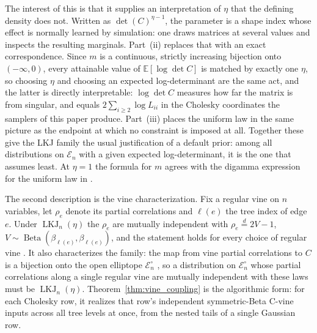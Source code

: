 \documentclass[12pt,english]{article}
\theoremstyle{plain} %
\theoremstyle{definition} %
\theoremstyle{remark} %
\begin{document}
The interest of this is that it supplies an interpretation of $\eta$ that the defining density does not. Written as $\det(C)^{\eta-1}$, the parameter is a shape index whose effect is normally learned by simulation: one draws matrices at several values and inspects the resulting marginals. Part~(ii) replaces that with an exact correspondence. Since $m$ is a continuous, strictly increasing bijection onto $(-\infty,0)$, every attainable value of $\mathbb{E}[\log\det C]$ is matched by exactly one $\eta$, so choosing $\eta$ and choosing an expected log-determinant are the same act, and the latter is directly interpretable: $\log\det C$ measures how far the matrix is from singular, and equals $2\sum_{i\geq2}\log L_{ii}$ in the Cholesky coordinates the samplers of this paper produce. Part~(iii) places the uniform law in the same picture as the endpoint at which no constraint is imposed at all. Together these give the LKJ family the usual justification of a default prior: among all distributions on $\mathcal{E}_n$ with a given expected log-determinant, it is the one that assumes least. At $\eta=1$ the formula for $m$ agrees with the digamma expression for the uniform law in \citet{Hansen:CorrelationMatrix}.

The second description is the vine characterization. Fix a regular vine on $n$ variables, let $\rho_e$ denote its partial correlations and $\ell(e)$ the tree index of edge $e$. Under $\operatorname{LKJ}_n(\eta)$ the $\rho_e$ are mutually independent with $\rho_e\overset{d}{=}2V-1$, $V\sim\operatorname{Beta}(\beta_{\ell(e)},\beta_{\ell(e)})$, and the statement holds for every choice of regular vine \citep[Theorem~1]{LewandowskiKurowickaJoe:2009}. It also characterizes the family: the map from vine partial correlations to $C$ is a bijection onto the open elliptope $\mathcal{E}_n^\circ$ \citep{BedfordCooke:2002,KurowickaCooke:2003}, so a distribution on $\mathcal{E}_n^\circ$ whose partial correlations along a single regular vine are mutually independent with these laws must be $\operatorname{LKJ}_n(\eta)$. Theorem~\ref{thm:vine_coupling} is the algorithmic form: for each Cholesky row, it realizes that row's independent symmetric-Beta C-vine inputs across all tree levels at once, from the nested tails of a single Gaussian row.
\end{document}
